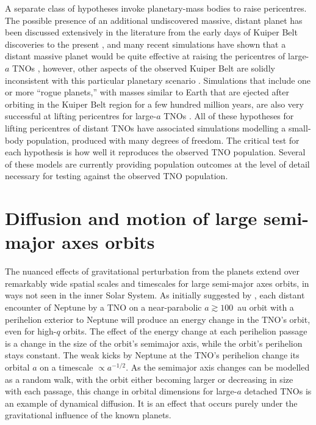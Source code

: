 \documentclass{aastex62}
\begin{document}
A separate class of hypotheses invoke planetary-mass bodies to raise pericentres.
The possible presence of an additional undiscovered massive, distant planet has been discussed extensively in the literature from the early days of Kuiper Belt discoveries to the present \citep{gladman02,brownetal04,LykawkaMukai2008,soaresgomes13,trujillosheppard14}, and many recent simulations have shown that a distant massive planet would be quite effective at raising the pericentres of large-$a$ TNOs \citep{batyginbrown16,shankman17,lawler2017,Lietal2018}, however, other aspects of the observed Kuiper Belt are solidly inconsistent with this particular planetary scenario \citep{lawler2017,shankman17,shankman17bias}.  
Simulations that include one or more ``rogue planets,'' with masses similar to Earth that are ejected after orbiting in the Kuiper Belt region for a few hundred million years, are also very successful at lifting pericentres for large-$a$ TNOs \citep{gladmanchan06,silsbee18}.
All of these hypotheses for lifting pericentres of distant TNOs have associated simulations modelling a small-body population, produced with many degrees of freedom. 
The critical test for each hypothesis is how well it reproduces the observed TNO population. 
Several of these models are currently providing population outcomes at the level of detail necessary for testing against the observed TNO population.

\section{Diffusion and motion of large semi-major axes orbits} \label{sec:diffusion}

The nuanced effects of gravitational perturbation from the planets extend over remarkably wide spatial scales and timescales for large semi-major axes orbits, in ways not seen in the inner Solar System.
As initially suggested by \citet{Duncan1987}, each distant encounter of Neptune by a TNO on a near-parabolic $a \gtrsim 100$~au orbit with a perihelion exterior to Neptune will produce an energy change in the TNO's orbit, even for high-$q$ orbits. 
The effect of the energy change at each perihelion passage is a change in the size of the orbit's semimajor axis, while the orbit's perihelion stays constant.
The weak kicks by Neptune at the TNO's perihelion change its orbital $a$ on a timescale $\propto a^{-1/2}$.
As the semimajor axis changes can be modelled as a random walk, with the orbit either becoming larger or decreasing in size with each passage, this change in orbital dimensions for large-$a$ detached TNOs is an example of dynamical diffusion.
It is an effect that occurs purely under the gravitational influence of the known planets.
\end{document}
